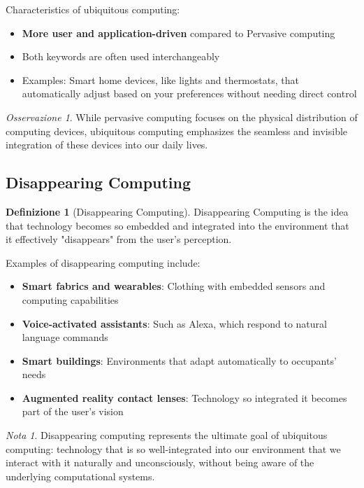 \documentclass[11pt,a4paper]{article}
\theoremstyle{definition}
\newtheorem{definition}{Definizione}[section]
\theoremstyle{plain}
\theoremstyle{remark}
\newtheorem*{remark}{Nota}
\newtheorem*{observation}{Osservazione}
\begin{document}
Characteristics of ubiquitous computing:

\begin{itemize}
    \item \textbf{More user and application-driven} compared to Pervasive computing
    \item Both keywords are often used interchangeably
    \item Examples: Smart home devices, like lights and thermostats, that automatically adjust based on your preferences without needing direct control
\end{itemize}

\begin{observation}
While pervasive computing focuses on the physical distribution of computing devices, ubiquitous computing emphasizes the seamless and invisible integration of these devices into our daily lives.
\end{observation}

\subsection{Disappearing Computing}

\begin{definition}[Disappearing Computing]
Disappearing Computing is the idea that technology becomes so embedded and integrated into the environment that it effectively "disappears" from the user's perception.
\end{definition}

Examples of disappearing computing include:

\begin{itemize}
    \item \textbf{Smart fabrics and wearables}: Clothing with embedded sensors and computing capabilities
    \item \textbf{Voice-activated assistants}: Such as Alexa, which respond to natural language commands
    \item \textbf{Smart buildings}: Environments that adapt automatically to occupants' needs
    \item \textbf{Augmented reality contact lenses}: Technology so integrated it becomes part of the user's vision
\end{itemize}

\begin{remark}
Disappearing computing represents the ultimate goal of ubiquitous computing: technology that is so well-integrated into our environment that we interact with it naturally and unconsciously, without being aware of the underlying computational systems.
\end{remark}
\end{document}
